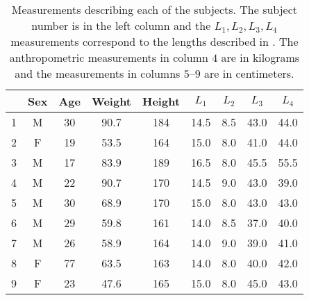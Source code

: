 \begin{table}[t!]

  \centering
  \caption[Measurements describing each of the subjects.]{Measurements
    describing each of the subjects.
    The subject number is in the left column and the $L_1,L_2,L_3,L_4$
    measurements correspond to the lengths described in .
    The anthropometric measurements in column $4$ are in kilograms and the
    measurements in columns $5$--$9$ are in centimeters.}
  \begin{tabular}{|c|c|c|c|c|c|c|c|c|}
    \hline
    & \!Sex\! & \!Age\! &  \!Weight\! & \!Height\! & $L_1$ & $L_2$ & $L_3$ &
    $L_4$ \\ \hline
    1 & M & 30 & 90.7& 184& 14.5& 8.5& 43.0& 44.0 \\ \hline
    2 & F & 19 & 53.5& 164& 15.0& 8.0& 41.0& 44.0\\ \hline
    3 & M & 17 & 83.9& 189& 16.5& 8.0& 45.5& 55.5 \\ \hline
    4 & M & 22 & 90.7& 170& 14.5& 9.0& 43.0& 39.0\\ \hline
    5 & M & 30 & 68.9& 170& 15.0& 8.0& 43.0& 43.0\\ \hline
    6 & M & 29 & 59.8& 161& 14.0& 8.5& 37.0& 40.0\\ \hline
    7 & M & 26 & 58.9& 164& 14.0& 9.0& 39.0& 41.0\\ \hline
    8 & F & 77 & 63.5& 163& 14.0& 8.0& 40.0& 42.0\\ \hline
    9 & F & 23 & 47.6& 165& 15.0& 8.0& 45.0& 43.0\\ \hline
  \end{tabular}
  \label{tab:measurements}
\end{table}

